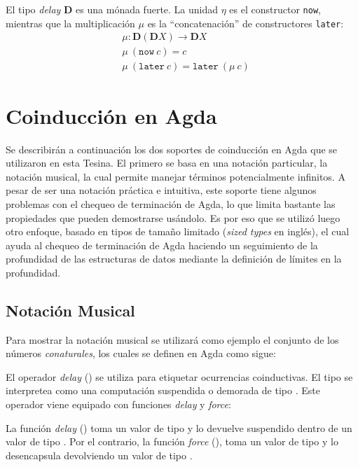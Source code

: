 El tipo \textit{delay} $\mathbf{D}$ es una mónada fuerte. La unidad $\eta$ es el constructor \texttt{now}, mientras que la multiplicación $\mu$ es la ``concatenación'' de constructores \texttt{later}:
\begin{align*}
& \mu : \mathbf{D} (\mathbf{D} X) \rightarrow \mathbf{D} X  \\
& \mu \ (\mathtt{now} \ c) = c \\
& \mu \ (\mathtt{later} \ c) = \mathtt{later} \ (\mu \ c)
\end{align*}


\section{Coinducción en Agda}\label{coind:agda}

Se describirán a continuación los dos soportes de coinducción en Agda que se utilizaron en esta Tesina. El primero se basa en una notación particular, la notación musical, la cual permite manejar términos potencialmente infinitos. A pesar de ser una notación práctica e intuitiva, este soporte tiene algunos problemas con el chequeo de terminación de Agda, lo que limita bastante las propiedades que pueden demostrarse usándolo. Es por eso que se utilizó luego otro enfoque, basado en tipos de tamaño limitado (\textit{sized types} en inglés), el cual ayuda al chequeo de terminación de Agda haciendo un seguimiento de la profundidad de las estructuras de datos mediante la definición de límites en la profundidad. 

\subsection{Notación Musical}\label{coind:agda:musical}

Para mostrar la notación musical se utilizará como ejemplo el conjunto de los números \textit{conaturales}, los cuales se definen en Agda como sigue:


El operador \textit{delay} (\AgdaDatatype{$\infty$}) se utiliza para etiquetar ocurrencias coinductivas. El tipo  se interpretea como una computación suspendida o demorada de tipo . Este operador viene equipado con funciones \textit{delay} y \textit{force}:


La función \textit{delay} (\AgdaFunction{$\sharp\_$}) toma un valor de tipo  y lo devuelve suspendido dentro de un valor de tipo . Por el contrario, la función \textit{force} (\AgdaFunction{$\flat$}), toma un valor de tipo  y lo desencapsula devolviendo un valor de tipo .

